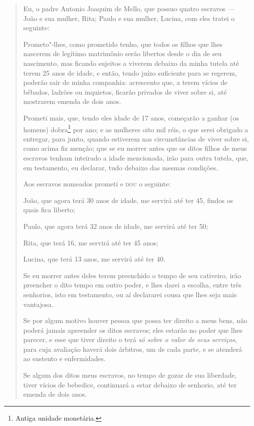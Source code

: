\begin{quote}
Eu, o padre Antonio Joaquim de Mello, que possuo quatro escravos ---
João e sua mulher, Rita; Paulo e sua mulher, Lucina, com eles tratei o
seguinte:

Prometo"-lhes, como prometido tenho, que todos os filhos que lhes
nascerem de legítimo matrimônio serão libertos desde o dia de seu
nascimento, mas ficando sujeitos a viverem debaixo da minha tutela até
terem 25 anos de idade, e então, tendo juízo suficiente para se regerem,
poderão sair de minha companhia: acrescento que, a terem vícios de
bêbados, ladrões ou inquietos, ficarão privados de viver sobre si, até
mostrarem emenda de dois anos.

Prometi mais, que, tendo eles idade de 17 anos, começarão a ganhar (os
homens) dobra\footnote{Antiga unidade monetária.} por ano; e as
mulheres oito mil réis, o que serei obrigado a entregar, para junto,
quando estiverem nas circunstâncias de viver sobre si, como acima fiz
menção; que se eu morrer antes que os ditos filhos de meus escravos
tenham inteirado a idade mencionada, irão para outra tutela, que, em
testamento, eu declarar, tudo debaixo das mesmas condições.

\noindent{}Aos escravos nomeados prometi e \textsc{dou} o seguinte:

\noindent{}João, que agora terá 30 anos de idade, me servirá até ter 45, findos os
quais fica liberto;

\noindent{}Paulo, que agora terá 32 anos de idade, me servirá até ter 50;

\noindent{}Rita, que terá 16, me servirá até ter 45 anos;

\noindent{}Lucina, que terá 13 anos, me servirá até ter 40.

Se eu morrer antes deles terem preenchido o tempo de seu cativeiro, irão
preencher o dito tempo em outro poder, e lhes darei a escolha, entre
três senhorios, isto em testamento, ou aí declararei cousa que lhes seja
mais vantajosa.

Se por algum motivo houver pessoa que possa ter direito a meus bens, não
poderá jamais apreender os ditos escravos; eles estarão no poder que
lhes parecer, e esse que tiver direito o terá \emph{só sobre o valor de
seus serviços}, para cuja avaliação haverá dois árbitros, um de cada
parte, e se atenderá ao sustento e enfermidades.

Se algum dos ditos meus escravos, no tempo de gozar de sua liberdade,
tiver vícios de bebedice, continuará a estar debaixo de senhorio, até
ter emenda de dois anos.


\end{quote}
